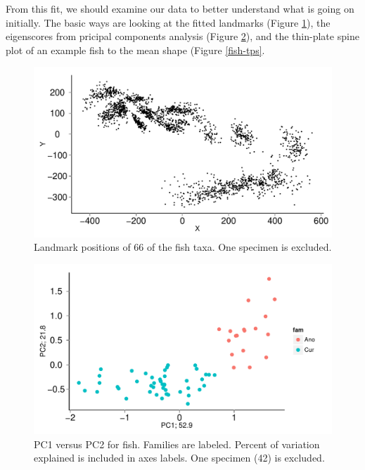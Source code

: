 \documentclass{article}\usepackage{graphicx, color}
\begin{document}
From this fit, we should examine our data to better understand what is going on initially. The basic ways are looking at the fitted landmarks (Figure \ref{fish-plotshapes}), the eigenscores from pricipal components analysis (Figure \ref{fish-pca}), and the thin-plate spine plot of an example fish to the mean shape (Figure \ref{fish-tps}.













\begin{figure}
\includegraphics[height=0.3\textheight]{figure/fish-ex1}
\caption{Landmark positions of 66 of the fish taxa. One specimen is excluded.\label{fish-plotshapes}}
\end{figure}

\begin{figure}
\includegraphics[height=0.3\textheight]{figure/fish-ex2}
\caption{PC1 versus PC2 for fish. Families are labeled. Percent of variation explained is included in axes labels. One specimen (42) is excluded.\label{fish-pca}}
\end{figure}
\end{document}
